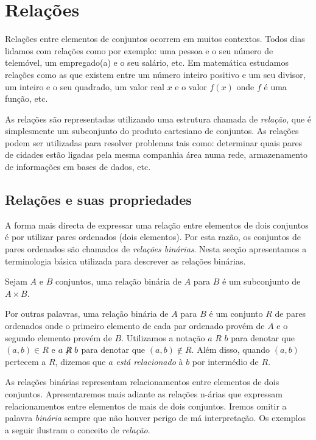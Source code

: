 \chapter{Relações}
\label{cap:relacoes}

Relações entre elementos de conjuntos ocorrem em muitos contextos. Todos dias
lidamos com relações como por exemplo: uma pessoa e o seu número de telemóvel,
um empregado(a) e o seu salário, etc. Em matemática estudamos relações como as
que existem entre um número inteiro positivo e um seu divisor, um inteiro e o
seu quadrado, um valor real $x$ e o valor $f(x)$ onde $f$ é uma função, etc.

As relações são representadas utilizando uma estrutura chamada de
\emph{relação}, que é simplesmente um subconjunto do produto cartesiano de
conjuntos. As relações podem ser utilizadas para resolver problemas tais como:
determinar quais pares de cidades estão ligadas pela mesma companhia área numa
rede, armazenamento de informações em bases de dados, etc.

\section{Relações e suas propriedades}

A forma mais directa de expressar uma relação entre elementos de dois conjuntos
é por utilizar pares ordenados (dois elementos). Por esta razão, os conjuntos de
pares ordenados são chamados de \emph{relações binárias}. Nesta secção
apresentamos a terminologia básica utilizada para descrever as relações binárias.

\label{def41}
\begin{defn}
Sejam $A$ e $B$ conjuntos, uma relação binária de $A$ para $B$ é um subconjunto
de $A \times B$.
\end{defn}

Por outras palavras, uma relação binária de $A$ para $B$ é um conjunto $R$ de
pares ordenados onde o primeiro elemento de cada par ordenado provém de $A$ e o
segundo elemento provém de $B$. Utilizamos a notação $a$ $R$ $b$ para denotar
que $(a,b) \in R$ e $a \centernot{R} b$ para denotar que $(a,b) \notin R$. Além
disso, quando $(a,b)$ pertecem a $R$, dizemos que $a$ \emph{está relacionado} à
$b$ por intermédio de $R$.

As relações binárias representam relacionamentos entre elementos de dois
conjuntos. Apresentaremos mais adiante as relações n-árias que expressam
relacionamentos entre elementos de mais de dois conjuntos. Iremos omitir a
palavra \emph{binária} sempre que não houver perigo de má interpretação. Os
exemplos a seguir ilustram o conceito de \emph{relação}.

